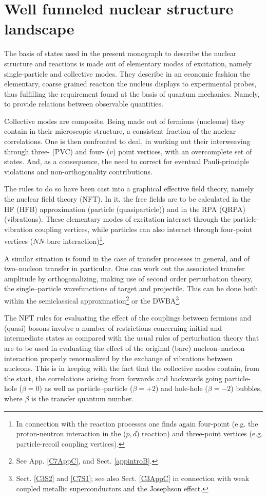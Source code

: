 \section{Well funneled nuclear structure landscape}\label{C1S4}
The basis of states used in the present monograph to describe the nuclear structure and reactions is made out of elementary modes of excitation, namely single-particle and collective modes. They describe in an economic fashion the elementary, coarse grained reaction the nucleus displays to experimental probes, thus fulfilling the requirement found at the basis of quantum mechanics. Namely, to provide relations between observable quantities.

Collective modes are composite. Being made out of fermions (nucleons) they contain in their microscopic structure, a consistent fraction of the nuclear correlations. One is  then confronted to deal, in working out their interweaving through three- (PVC) and four- ($v$) point vertices, with an overcomplete set of states. And, as a consequence, the need to correct for eventual Pauli-principle violations and non-orthogonality contributions.

 The rules to do so have been cast into a graphical effective field theory, namely the nuclear field theory (NFT). In it, the free fields are to be calculated in the HF (HFB) approximation (particle (quasiparticle)) and in the RPA (QRPA) (vibrations). These elementary modes of excitation interact through the particle-vibration coupling vertices, while particles can also interact through four-point vertices ($NN$-bare interaction)\footnote{In connection with the reaction processes one finds again four-point  (e.g. the proton-neutron interaction in the ($p,d$) reaction) and three-point vertices (e.g. particle-recoil coupling vertices).}.

A similar situation is found in the case of transfer processes in general, and of two--nucleon transfer in particular. One can work out the associated transfer amplitude by orthogonalizing, making use of second order perturbation theory, the single--particle wavefunctions of target and projectile. This can be done both within the semiclassical approximation\footnote{See App. \ref{C7AppC}, and Sect. \ref{appintroB}.}  or the  DWBA\footnote{Sect. \ref{C3S2} and \ref{C7S1}; see also Sect. \ref{C3AppC} in connection with weak coupled metallic superconductors and  the Josephson effect.}. 

The NFT rules  for evaluating the effect of the couplings between fermions and (quasi) bosons involve a number of restrictions concerning initial and intermediate states as compared with the usual rules of perturbation theory that are to be used in evaluating the effect of the original (bare) nucleon--nucleon interaction properly renormalized by  the exchange of vibrations between nucleons. This is in keeping with the fact that the collective modes contain, from the start,  the correlations arising from forwards and backwards going  particle-hole ($\beta=0$) as well as particle--particle ($\beta=+2$) and hole-hole ($\beta=-2$) bubbles, where $\beta$ is the transfer quantum number. 
 

